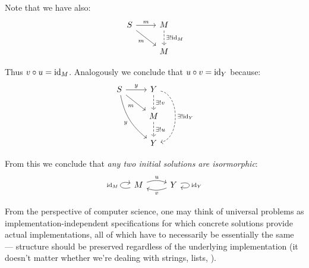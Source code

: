 Note that we have also:
$$
\begin{tikzcd}
    S \arrow[r, "m"] \arrow[rd, swap, "m"] &
    M \arrow[d, dashed, "\exists! \id{M}"] \\
    {} & M
\end{tikzcd}
$$

Thus $v \circ u = \mathrm{id}_{ M }$. Analogously we conclude that $u \circ v = \mathrm{id}_{ Y }$
because:
$$
\begin{tikzcd}
    S \arrow[r, "y"] \arrow[rd, swap, "m"]
    \arrow[rdd, swap, bend right = 20, "y"] &
    Y \arrow[d, dashed, "\exists! v"]
    \arrow[dd, dashed, bend left = 80, "\exists! \id{Y}"] \\
    {} & M \arrow[d, dashed, "\exists! u"] \\
    {} & Y
\end{tikzcd}
$$

From this we conclude that \textit{any two initial solutions are isormorphic}:
$$
\begin{tikzcd}
    M \arrow[r, bend left = 20, "u"] \arrow[loop left, "\id{M}"] &
    Y \arrow[l, bend left = 20, "v"] \arrow[loop right, "\id{Y}"]
\end{tikzcd}
$$

From the perspective of computer science, one may think of universal problems
as implementation-independent specifications for which concrete solutions
provide actual implementations, all of which have to necessarily be
essentially the same --- structure should be preserved regardless of the
underlying implementation (it doesn't matter whether we're dealing with
strings, lists, \etc).

